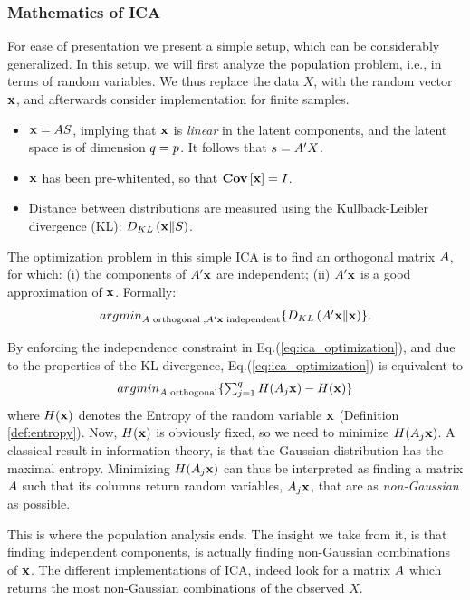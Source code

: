 \documentclass[12pt,a4paper]{article}
\begin{document}
\subsubsection{Mathematics of ICA}
For ease of presentation we present a simple setup, which can be considerably generalized. 
In this setup, we will first analyze the population problem, i.e., in terms of random variables. 
We thus replace the data $X$, with the random vector $\mathbf{x}$, and afterwards consider implementation for finite samples. 
\begin{itemize}
	\item $\mathbf{x}=A S$, implying that $\mathbf{x}$ is \emph{linear} in the latent components, and the latent space is of dimension $q=p$. It follows that $s=A'X$.
	\item $\mathbf{x}$ has been pre-whitented, so that $\mathbf{Cov} \left[ \mathbf{x} \right]=I$.
	\item Distance between distributions are measured using the Kullback-Leibler divergence (KL): $D_{KL}\left(\mathbf{x} \Vert S \right)$.
\end{itemize}

The optimization problem in this simple ICA is to find an orthogonal matrix $A$, for which:
(i) the components of $A'\mathbf{x}$ are independent;
(ii) $A'\mathbf{x}$ is a good approximation of $\mathbf{x}$.
Formally: 
\begin{align}
\label{eq:ica_optimization}
\textstyle{\mathop{argmin}_{A\text{ orthogonal} \;; A'\mathbf{x}\text{ independent}}}\{ D_{KL}\left(A'\mathbf{x} \Vert \mathbf{x} \right) \}.
\end{align}


By enforcing the independence constraint in Eq.(\ref{eq:ica_optimization}), and due to the properties of the KL divergence, Eq.(\ref{eq:ica_optimization}) is equivalent to
\begin{align}
\label{eq:ica_optimization2}
\textstyle{\mathop{argmin}_{A\text{ orthogonal}}}\{ \sum_{j=1}^{q} H(A_j\mathbf{x})- H(\mathbf{x}) \}
\end{align}
where $H(\mathbf{x})$ denotes the Entropy of the random variable $\mathbf{x}$ (Definition \ref{def:entropy}).
Now, $H(\mathbf{x})$ is obviously fixed, so we need to minimize $H(A_j\mathbf{x})$. 
A classical result in information theory, is that the Gaussian distribution has the maximal entropy. 
Minimizing $H(A_j\mathbf{x})$ can thus be interpreted as finding a matrix $A$ such that its columns return random variables, $A_j\mathbf{x}$, that are as \emph{non-Gaussian} as possible.

This is where the population analysis ends. 
The insight we take from it, is that finding independent components, is actually finding non-Gaussian combinations of $\mathbf{x}$. 
The different implementations of ICA, indeed look for a matrix $A$ which returns the most non-Gaussian combinations of the observed $X$. 
\end{document}

